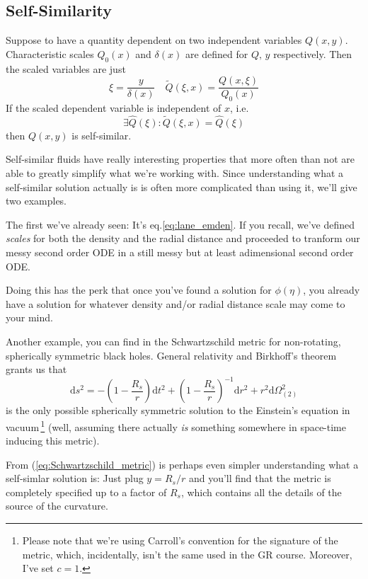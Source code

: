\subsection{Self-Similarity}
Suppose to have a quantity dependent on two independent variables $Q(x,y)$. Characteristic scales $Q_{0}(x)$ and $\delta(x)$ are defined for $Q,\,y$ respectively. Then the scaled variables are just 
\begin{equation*}
    \xi = \frac{y}{\delta(x)} \quad \tilde{Q}(\xi, x)=\frac{Q(x,\xi)}{Q_{0}(x)}
\end{equation*}
If the scaled dependent variable is independent of $x$, i.e.
\begin{equation*}
    \exists\hat{Q}(\xi): \tilde{Q}(\xi, x) = \hat{Q}(\xi)
\end{equation*}
then $Q(x,y)$ is self-similar.
\par Self-similar fluids have really interesting properties that more often than not are able to greatly simplify what we're working with. Since understanding what a self-similar solution actually is is often more complicated than using it, we'll give two examples.
\par The first we've already seen: It's eq.\ref{eq:lane_emden}. If you recall, we've defined \emph{scales} for both the density and the radial distance and proceeded to tranform our messy second order ODE in a still messy but at least adimensional second order ODE.
\par Doing this has the perk that once you've found a solution for $\phi(\eta)$, you already have a solution for whatever density and/or radial distance scale may come to your mind.
\par Another example, you can find in the Schwartzschild metric for non-rotating, spherically symmetric black holes. General relativity and Birkhoff's theorem grants us that 
\begin{equation}
    \text{d}s^{2} = -\left(1-\frac{R_{s}}{r}\right)\text{d}t^{2}+\left(1-\frac{R_{s}}{r}\right)^{-1}\text{d}r^{2}+r^{2}\text{d}\Omega_{(2)}^{2}
    \label{eq:Schwartzschild_metric}
\end{equation}
is the only possible spherically symmetric solution to the Einstein's equation in vacuum\,\footnote{Please note that we're using Carroll's \cite{carroll} convention for the signature of the metric, which, incidentally, isn't the same used in the GR course. Moreover, I've set $c=1$.} (well, assuming there actually \emph{is} something somewhere in space-time inducing this metric).
\par From (\ref{eq:Schwartzschild_metric}) is perhaps even simpler understanding what a self-simlar solution is: Just plug $y = R_{s}/r$ and you'll find that the metric is completely specified up to a factor of $R_{s}$, which contains all the details of the source of the curvature.
